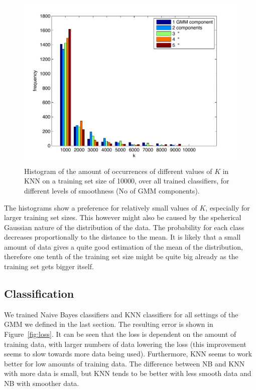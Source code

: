 \documentclass[a4paper]{article}
\begin{document}
\begin{figure}[htb]
    \centering
    \includegraphics[width=.9\textwidth]{Hist10000.pdf}
    \caption{Histogram of the amount of occurrences of different values of $K$ in KNN on a training set size of 10000, over all trained classifiers, for different levels of smoothness (No of GMM components). \label{fig:hist10000}}
\end{figure}

The histograms show a preference for relatively small values of $K$, especially for larger training set sizes. This however might also be caused by the speherical Gaussian nature of the distribution of the data. The probability for each class decreases proportionally to the distance to the mean. It is likely that a small amount of data gives a quite good estimation of the mean of the distribution, therefore one tenth of the training set size might be quite big already as the training set gets bigger itself. 

\subsection{Classification}
We trained Naive Bayes classifiers and KNN classifiers for all settings of the \ac{GMM} we defined in the last section. The resulting error is shown in Figure~\ref{fig:loss}. It can be seen that the loss is dependent on the amount of training data, with larger numbers of data lowering the loss (this improvement seems to slow towards more data being used). Furthermore, KNN seems to work better for low amounts of training data. The difference between NB and KNN with more data is small, but KNN tends to be better with less smooth data and NB with smoother data.
\end{document}
